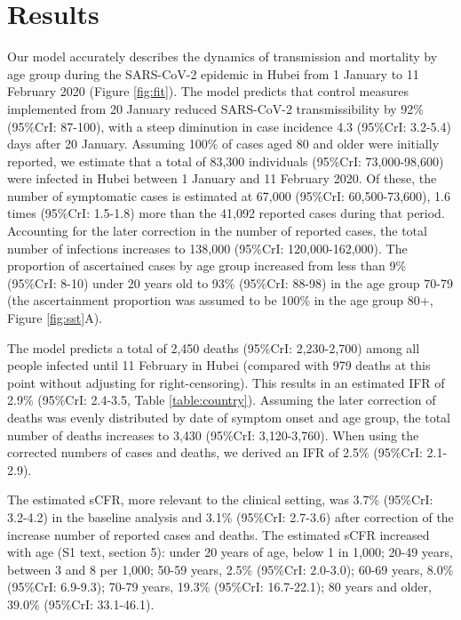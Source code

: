 \documentclass{article}
\begin{document}
\section*{Results}

Our model accurately describes the dynamics of transmission and mortality by age group during the SARS-CoV-2 epidemic in Hubei from 1 January to 11 February 2020 (Figure \ref{fig:fit}).
The model predicts that control measures implemented from 20 January reduced SARS-CoV-2 transmissibility by 92\% (95\%CrI: 87-100), with a steep diminution in case incidence 4.3 (95\%CrI: 3.2-5.4) days after 20 January. 
Assuming 100\% of cases aged 80 and older were initially reported, we estimate that a total of 83,300 individuals (95\%CrI: 73,000-98,600) were infected in Hubei between 1 January and 11 February 2020.
Of these, the number of symptomatic cases is estimated at 67,000 (95\%CrI: 60,500-73,600), 1.6 times (95\%CrI: 1.5-1.8) more than the 41,092 reported cases during that period. 
Accounting for the later correction in the number of reported cases, the total number of infections increases to 138,000 (95\%CrI: 120,000-162,000). 
The proportion of ascertained cases by age group increased from less than 9\% (95\%CrI: 8-10) under 20 years old to 93\% (95\%CrI: 88-98) in the age group 70-79 (the ascertainment proportion was assumed to be 100\% in the age group 80+, Figure \ref{fig:sst}A).

The model predicts a total of 2,450 deaths (95\%CrI: 2,230-2,700) among all people infected until 11 February in Hubei (compared with 979 deaths at this point without adjusting for right-censoring).
This results in an estimated IFR of 2.9\% (95\%CrI: 2.4-3.5, Table \ref{table:country}).
Assuming the later correction of deaths was evenly distributed by date of symptom onset and age group, the total number of deaths increases to 3,430 (95\%CrI: 3,120-3,760). 
When using the corrected numbers of cases and deaths, we derived an IFR of 2.5\% (95\%CrI: 2.1-2.9).

The estimated sCFR, more relevant to the clinical setting, was 3.7\% (95\%CrI: 3.2-4.2) in the baseline analysis and 3.1\% (95\%CrI: 2.7-3.6) after correction of the increase number of reported cases and deaths.
The estimated sCFR increased with age (S1 text, section 5): under 20 years of age, below 1 in 1,000; 20-49 years, between 3 and 8 per 1,000; 50-59 years, 2.5\% (95\%CrI: 2.0-3.0); 60-69 years, 8.0\% (95\%CrI: 6.9-9.3); 70-79 years, 19.3\% (95\%CrI: 16.7-22.1); 80 years and older, 39.0\% (95\%CrI: 33.1-46.1).
\end{document}
